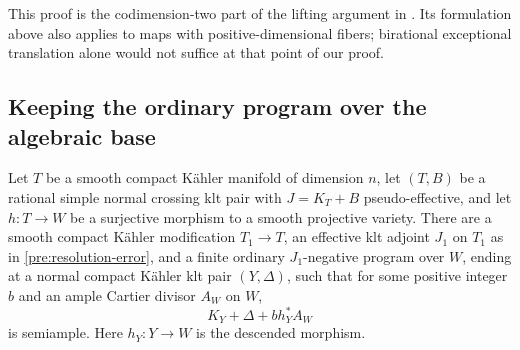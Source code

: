 This proof is the codimension-two part of the lifting argument in
\cite[Section~5]{K}. Its formulation above also applies to maps with
positive-dimensional fibers; birational exceptional translation alone
would not suffice at that point of our proof.

\subsection{Keeping the ordinary program over the algebraic base}

\begin{proposition}\label{finish:over-base}
Let \(T\) be a smooth compact K\"ahler manifold of dimension \(n\), let
\((T,B)\) be a rational simple normal crossing klt pair with
\(J=K_T+B\) pseudo-effective, and let
\(h:T\to W\) be a surjective morphism to a smooth projective variety.
There are a smooth compact K\"ahler modification \(T_1\to T\), an
effective klt adjoint \(J_1\) on \(T_1\) as in
\eqref{pre:resolution-error}, and a finite ordinary \(J_1\)-negative
program over \(W\), ending at a normal compact K\"ahler klt pair
\((Y,\Delta)\), such that for some positive integer \(b\) and an ample
Cartier divisor \(A_W\) on \(W\),
\[
 K_Y+\Delta+b h_Y^*A_W
\]
is semiample. Here \(h_Y:Y\to W\) is the descended morphism.
\end{proposition}
